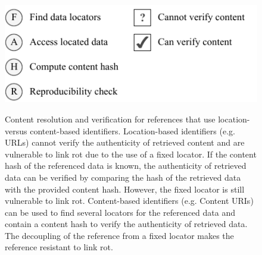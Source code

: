 \begin{figure}[!p] %


\centering
{} \\
 \\
 \\
\includegraphics[scale=.9]{figures/fig4legend_grayscale.pdf}%

\caption{Content resolution and verification for references that use location- versus content-based identifiers.  Location-based identifiers (e.g. URLs) cannot verify the authenticity of retrieved content and are vulnerable to link rot due to the use of a fixed locator.  If the content hash of the referenced data is known, the authenticity of retrieved data can be verified by comparing the hash of the retrieved data with the provided content hash. However, the fixed locator is still vulnerable to link rot.  Content-based identifiers (e.g. Content URIs) can be used to find several locators for the referenced data and contain a content hash to verify the authenticity of retrieved data. The decoupling of the reference from a fixed locator makes the reference resistant to link rot.
}%

\label{fig:verification} %

\end{figure}

